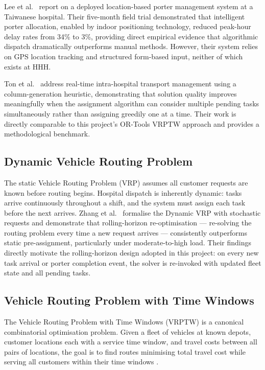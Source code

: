 \documentclass[12pt,a4paper]{article}
\begin{document}
Lee et al.\ \cite{lee2023} report on a deployed location-based porter management system at a Taiwanese hospital. Their five-month field trial demonstrated that intelligent porter allocation, enabled by indoor positioning technology, reduced peak-hour delay rates from 34\% to 3\%, providing direct empirical evidence that algorithmic dispatch dramatically outperforms manual methods. However, their system relies on GPS location tracking and structured form-based input, neither of which exists at HHH.

Ton et al.\ \cite{ton2024} address real-time intra-hospital transport management using a column-generation heuristic, demonstrating that solution quality improves meaningfully when the assignment algorithm can consider multiple pending tasks simultaneously rather than assigning greedily one at a time. Their work is directly comparable to this project's OR-Tools VRPTW approach and provides a methodological benchmark.

\subsection{Dynamic Vehicle Routing Problem}

The static Vehicle Routing Problem (VRP) assumes all customer requests are known before routing begins. Hospital dispatch is inherently dynamic: tasks arrive continuously throughout a shift, and the system must assign each task before the next arrives. Zhang et al.\ \cite{zhang2023} formalise the Dynamic VRP with stochastic requests and demonstrate that rolling-horizon re-optimisation --- re-solving the routing problem every time a new request arrives --- consistently outperforms static pre-assignment, particularly under moderate-to-high load. Their findings directly motivate the rolling-horizon design adopted in this project: on every new task arrival or porter completion event, the solver is re-invoked with updated fleet state and all pending tasks.

\subsection{Vehicle Routing Problem with Time Windows}

The Vehicle Routing Problem with Time Windows (VRPTW) is a canonical combinatorial optimisation problem. Given a fleet of vehicles at known depots, customer locations each with a service time window, and travel costs between all pairs of locations, the goal is to find routes minimising total travel cost while serving all customers within their time windows \cite{euchi2020}.
\end{document}
